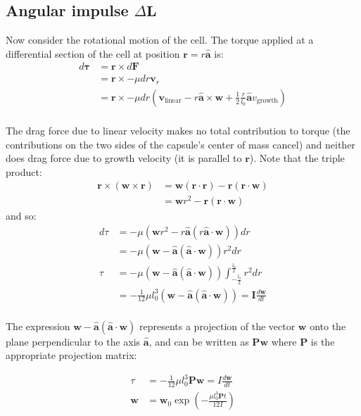 \documentclass{report}
\let\oldhat\hat
\renewcommand{\vec}[1]{\mathbf{#1}}
\renewcommand{\hat}[1]{\oldhat{\mathbf{#1}}}
\newcommand{\mat}{\mathbf}
\begin{document}
\begin{appendices}
\section{Angular impulse $\Delta\vec{L}$}
Now consider the rotational motion of the cell.  The torque applied at a
differential section of the cell at position $\vec{r}=r\hat{\vec{a}}$ is:
\begin{align*}
d\vec{\tau} &= \vec{r} \times d\vec{F} \\
&= \vec{r} \times -\mu dr \vec{v}_r \\
&= \vec{r} \times -\mu dr \left(
\vec{v}_\textrm{linear}
- r\hat{a} \times \vec{w}
+ \frac{1}{2}\frac{r}{l_0}\hat{a}v_\textrm{growth}
\right) \\
\end{align*}

The drag force due to linear velocity makes no total
contribution to torque (the contributions on the two sides of the
capsule's center of mass cancel) and neither does drag force due to
growth velocity (it is parallel to $\vec{r}$).  Note that the triple product:
\begin{align*}
\vec{r}\times(\vec{w}\times\vec{r}) &= \vec{w}(\vec{r}\cdot\vec{r}) - \vec{r}(\vec{r}\cdot\vec{w}) \\
&= \vec{w}r^2 - \vec{r}(\vec{r}\cdot\vec{w})
\end{align*}
and so:
\begin{align*}
d\tau &= -\mu \left( \vec{w}r^2 - r\hat{a}(r\hat{a}\cdot\vec{w}) \right) dr \\
    &= -\mu \left( \vec{w} - \hat{a}(\hat{a}\cdot\vec{w}) \right) r^2 dr \\
\tau &= -\mu \left( \vec{w} - \hat{a}(\hat{a}\cdot\vec{w}) \right) \int_{-\frac{l_0}{2}}^{\frac{l_0}{2}}r^2dr \\
&=-\frac{1}{12}\mu l_0^3 \left( \vec{w} - \hat{a}(\hat{a}\cdot\vec{w}) \right) = \mat{I}\frac{d\vec{w}}{dt} \\
\end{align*}

The expression $\vec{w} - \hat{a}(\hat{a}\cdot\vec{w})$ represents a projection of the vector $\vec{w}$ onto the
plane perpendicular to the axis $\hat{a}$, and can be written as $\mat{P}\vec{w}$ where $\mat{P}$ is the
appropriate projection matrix:

\begin{align*}
\tau &=-\frac{1}{12}\mu l_0^3 \mat{P}\vec{w}  = I\frac{d\vec{w}}{dt} \\
\vec{w} &= \vec{w}_0 \exp{\left( -\frac{\mu l_0^3 \mat{P}t}{12 I} \right)} \\
\end{align*}


\end{appendices}
\end{document}
